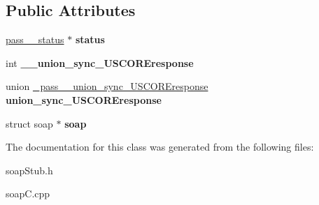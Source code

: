 \subsection*{Public Attributes}
\begin{DoxyCompactItemize}
\item 
\hypertarget{class__pass____sync__USCOREresponse_acfa97b3011c3cd312ab31e1157ae4c70}{
\hyperlink{classpass____status}{pass\_\-\_\-status} $\ast$ {\bfseries status}}
\label{class__pass____sync__USCOREresponse_acfa97b3011c3cd312ab31e1157ae4c70}

\item 
\hypertarget{class__pass____sync__USCOREresponse_afc17cca25a6cb86ff543d32c3ab6bbe3}{
int {\bfseries \_\-\_\-union\_\-sync\_\-USCOREresponse}}
\label{class__pass____sync__USCOREresponse_afc17cca25a6cb86ff543d32c3ab6bbe3}

\item 
\hypertarget{class__pass____sync__USCOREresponse_ada3cb7997cd70ac64e56505a6a6039dd}{
union \hyperlink{union__pass____union__sync__USCOREresponse}{\_\-pass\_\-\_\-union\_\-sync\_\-USCOREresponse} {\bfseries union\_\-sync\_\-USCOREresponse}}
\label{class__pass____sync__USCOREresponse_ada3cb7997cd70ac64e56505a6a6039dd}

\item 
\hypertarget{class__pass____sync__USCOREresponse_af7be71949b79d17b821e6b2eca63b05f}{
struct soap $\ast$ {\bfseries soap}}
\label{class__pass____sync__USCOREresponse_af7be71949b79d17b821e6b2eca63b05f}

\end{DoxyCompactItemize}


The documentation for this class was generated from the following files:\begin{DoxyCompactItemize}
\item 
soapStub.h\item 
soapC.cpp\end{DoxyCompactItemize}
